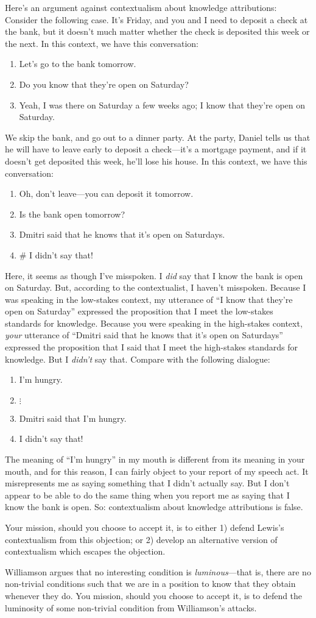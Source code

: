 \documentclass[10pt,leqno]{article}
\newcommand{\qe}{\begin{enumerate}}
\newcommand{\ze}{\end{enumerate}}
\newcommand{\p}{\item}
\newcommand{\e}{\emph}
\begin{document}
\p Here's an argument against contextualism about knowledge attributions: Consider the following case.  It's Friday, and you and I need to deposit a check at the bank, but it doesn't much matter whether the check is deposited this week or the next.  In this context, we have this conversation:
	\qe
	\p[Me:] Let's go to the bank tomorrow.
	\p[You:] Do you know that they're open on Saturday?
	\p[Me:] Yeah, I was there on Saturday a few weeks ago; I know that they're open on Saturday.
	\ze 
We skip the bank, and go out to a dinner party.  At the party, Daniel tells us that he will have to leave early to deposit a check---it's a mortgage payment, and if it doesn't get deposited this week, he'll lose his house.  In this context, we have this conversation:
	\qe
	\p[You:] Oh, don't leave---you can deposit it tomorrow.
	\p[Daniel:] Is the bank  open tomorrow?
	\p[You:] Dmitri said that he knows that it's open on Saturdays.
	\p[Me:] \# I didn't say that!
	\ze 
Here, it seems as though I've misspoken.  I \e{did} say that I know the bank is open on Saturday.  But, according to the contextualist, I haven't misspoken.  Because I was speaking in the low-stakes context, my utterance of ``I know that they're open on Saturday'' expressed the proposition that I meet the low-stakes standards for knowledge.   Because you were speaking in the high-stakes context, \e{your} utterance of ``Dmitri said that he knows that it's open on Saturdays'' expressed the proposition that I said that I meet the high-stakes standards for knowledge.  But I \e{didn't} say that.  Compare with the following dialogue:
	\qe
	\p[Me:] I'm hungry.
	\p[] $\vdots$
	\p[You:] Dmitri said that I'm hungry.
	\p[Me:] I didn't say that!
	\ze 
The meaning of ``I'm hungry'' in my mouth is different from its meaning in your mouth, and for this reason, I can fairly object to your report of my speech act.  It misrepresents me as saying something that I didn't actually say.  But I don't appear to be able to do the same thing when you report me as saying that I know the bank is open.  So: contextualism about knowledge attributions is false.

Your mission, should you choose to accept it, is to either 1) defend Lewis's contextualism from this objection; or 2) develop an alternative version of contextualism which escapes the objection.

\p Williamson argues that no interesting condition is \e{luminous}---that is, there are no non-trivial conditions such that we are in a position to know that they obtain whenever they do.  You mission, should you choose to accept it, is to defend the luminosity of some non-trivial condition from Williamson's attacks.
\end{document}
